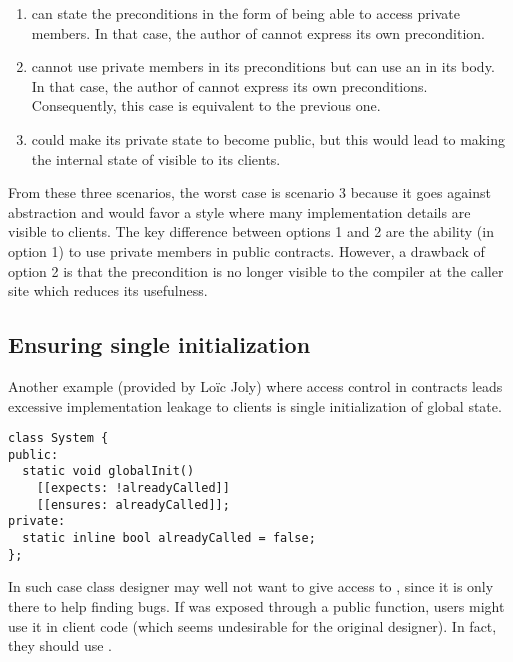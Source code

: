 \begin{enumerate}

\item {} can state the preconditions in the form of
\cppid{[[}\cppid{]]} being able to access private members. In
that case, the author of  cannot express its own
precondition.

\item {} cannot use private members in its
\cppid{[[}\cppid{]]} preconditions but can use an
\cppid{}\cppid{]]} in its body. In that case, the author of
 cannot express its own preconditions. Consequently,
this case is equivalent to the previous one.

\item {} could make its private state to become public, but this would
lead to making the internal state of  visible to its clients.

\end{enumerate}

From these three scenarios, the worst case is scenario 3 because it goes against
abstraction and would favor a style where many implementation details are
visible to clients. The key difference between options 1 and 2 are the ability
(in option 1) to use private members in public contracts. However, a drawback of
option 2 is that the precondition is no longer visible to the compiler at the
caller site which reduces its usefulness.

\subsection{Ensuring single initialization}

Another example (provided by Lo\"{i}c Joly) where access control in contracts leads excessive implementation
leakage to clients is single initialization of global state.

\begin{lstlisting}
class System {
public:
  static void globalInit()
    [[expects: !alreadyCalled]]
    [[ensures: alreadyCalled]];
private:
  static inline bool alreadyCalled = false;
};
\end{lstlisting}

In such case class designer may well not want to give access to
, since it is only there to help finding bugs. If
 was exposed through a public 
function, users might use it in client code (which seems undesirable for the
original designer). In fact, they should use .

